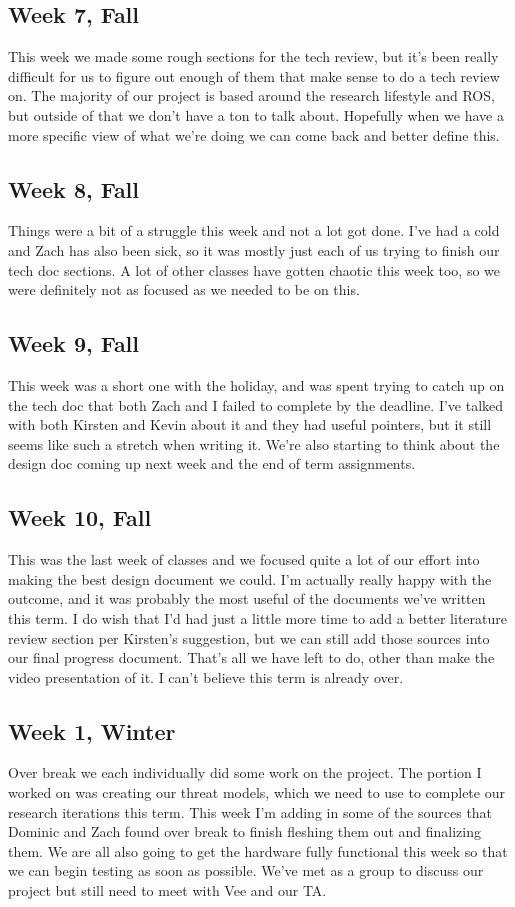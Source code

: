 \documentclass[IEEEtran,letterpaper,10pt,notitlepage,draftclsnofoot,onecolumn]{article}
\begin{document}
\begin{sloppypar}
\subsection{Week 7, Fall}
This week we made some rough sections for the tech review, but it's been really difficult for us to figure out enough of them that make sense to do a tech review on. The majority of our project is based around the research lifestyle and ROS, but outside of that we don't have a ton to talk about. Hopefully when we have a more specific view of what we're doing we can come back and better define this.
\subsection{Week 8, Fall}
Things were a bit of a struggle this week and not a lot got done. I've had a cold and Zach has also been sick, so it was mostly just each of us trying to finish our tech doc sections. A lot of other classes have gotten chaotic this week too, so we were definitely not as focused as we needed to be on this.
\subsection{Week 9, Fall}
This week was a short one with the holiday, and was spent trying to catch up on the tech doc that both Zach and I failed to complete by the deadline. I've talked with both Kirsten and Kevin about it and they had useful pointers, but it still seems like such a stretch when writing it. We're also starting to think about the design doc coming up next week and the end of term assignments.
\subsection{Week 10, Fall}
This was the last week of classes and we focused quite a lot of our effort into making the best design document we could. I'm actually really happy with the outcome, and it was probably the most useful of the documents we've written this term. I do wish that I'd had just a little more time to add a better literature review section per Kirsten's suggestion, but we can still add those sources into our final progress document. That's all we have left to do, other than make the video presentation of it. I can't believe this term is already over.
\subsection{Week 1, Winter}
Over break we each individually did some work on the project. The portion I worked on was creating our threat models, which we need to use to complete our research iterations this term. This week I'm adding in some of the sources that Dominic and Zach found over break to finish fleshing them out and finalizing them. We are all also going to get the hardware fully functional this week so that we can begin testing as soon as possible. We've met as a group to discuss our project but still need to meet with Vee and our TA.

\end{sloppypar}
\end{document}

